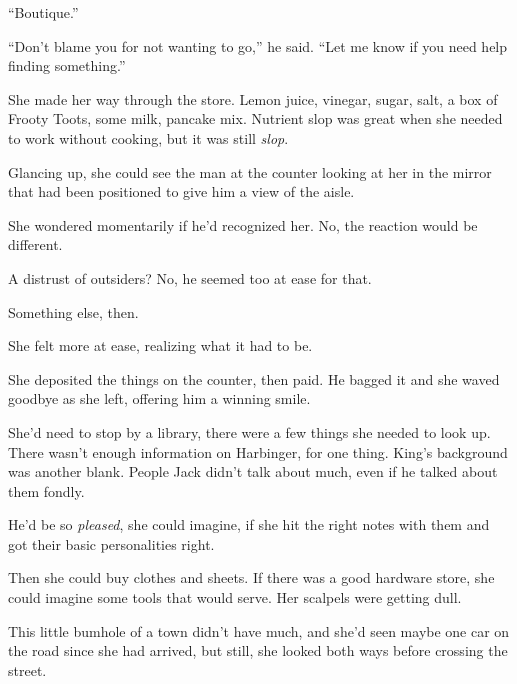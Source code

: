 ``Boutique.''



``Don't blame you for not wanting to go,'' he said.  ``Let me know if you need help finding something.''



She made her way through the store.  Lemon juice, vinegar, sugar, salt, a box of Frooty Toots, some milk, pancake mix.  Nutrient slop was great when she needed to work without cooking, but it was still \emph{slop}.



Glancing up, she could see the man at the counter looking at her in the mirror that had been positioned to give him a view of the aisle.



She wondered momentarily if he'd recognized her.  No, the reaction would be different.



A distrust of outsiders?  No, he seemed too at ease for that.



Something else, then.



She felt more at ease, realizing what it had to be.



She deposited the things on the counter, then paid.  He bagged it and she waved goodbye as she left, offering him a winning smile.



She'd need to stop by a library, there were a few things she needed to look up.  There wasn't enough information on Harbinger, for one thing.  King's background was another blank.  People Jack didn't talk about much, even if he talked about them fondly.



He'd be so \emph{pleased}, she could imagine, if she hit the right notes with them and got their basic personalities right.



Then she could buy clothes and sheets. If there was a good hardware store, she could imagine some tools that would serve.  Her scalpels were getting dull.



This little bumhole of a town didn't have much, and she'd seen maybe one car on the road since she had arrived, but still, she looked both ways before crossing the street.



